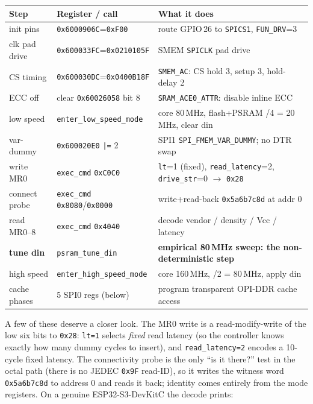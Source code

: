 \begin{longtable}{p{2.4cm} p{4.2cm} p{5.4cm}}
\toprule
\textbf{Step} & \textbf{Register / call} & \textbf{What it does} \\ \midrule
\endhead
init pins      & \texttt{0x6000906C}=\texttt{0xF00}        & route GPIO\,26 to \texttt{SPICS1}, \texttt{FUN\_DRV}=3 \\
clk pad drive  & \texttt{0x600033FC}=\texttt{0x0210105F}   & SMEM \texttt{SPICLK} pad drive \\
CS timing      & \texttt{0x600030DC}=\texttt{0x0400B18F}   & \texttt{SMEM\_AC}: CS hold 3, setup 3, hold-delay 2 \\
ECC off        & clear \texttt{0x60026058} bit 8           & \texttt{SRAM\_ACE0\_ATTR}: disable inline ECC \\
low speed      & \texttt{enter\_low\_speed\_mode}          & core 80\,MHz, flash+PSRAM /4 = 20\,MHz, clear din \\
var-dummy      & \texttt{0x600020E0} \verb#|=# 2           & SPI1 \texttt{SPI\_FMEM\_VAR\_DUMMY}; no DTR swap \\
write MR0      & \texttt{exec\_cmd} \texttt{0xC0C0}        & \texttt{lt}=1 (fixed), \texttt{read\_latency}=2, \texttt{drive\_str}=0 $\rightarrow$ \texttt{0x28} \\
connect probe  & \texttt{exec\_cmd} \texttt{0x8080}/\texttt{0x0000} & write+read-back \texttt{0x5a6b7c8d} at addr 0 \\
read MR0--8    & \texttt{exec\_cmd} \texttt{0x4040}        & decode vendor / density / Vcc / latency \\
\textbf{tune din} & \texttt{psram\_tune\_din}              & \textbf{empirical 80\,MHz sweep: the non-deterministic step} \\
high speed     & \texttt{enter\_high\_speed\_mode}         & core 160\,MHz, /2 = 80\,MHz, apply din \\
cache phases   & 5 SPI0 regs (below)                       & program transparent OPI-DDR cache access \\
\bottomrule
\end{longtable}

A few of these deserve a closer look. The MR0 write is a read-modify-write of the
low six bits to \texttt{0x28}: \texttt{lt=1} selects \emph{fixed} read latency (so
the controller knows exactly how many dummy cycles to insert), and
\texttt{read\_latency=2} encodes a 10-cycle fixed latency. The connectivity probe is
the only ``is it there?'' test in the octal path (there is no JEDEC \texttt{0x9F}
read-ID), so it writes the witness word \texttt{0x5a6b7c8d} to address 0 and reads
it back; identity comes entirely from the mode registers. On a genuine
ESP32-S3-DevKitC the decode prints:

